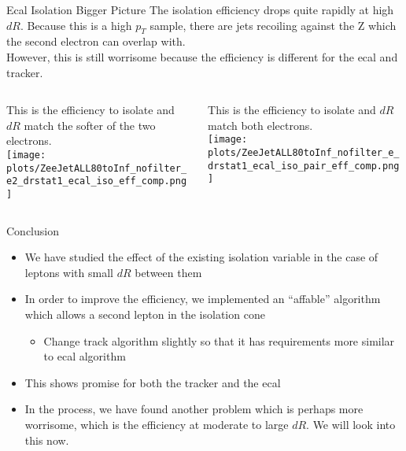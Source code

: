 \documentclass{beamer}
\begin{document}
\begin{frame}{Ecal Isolation Bigger Picture}
  The isolation efficiency drops quite rapidly at high $dR$. Because this is a high $p_T$ sample, there are jets recoiling against the Z which the second electron can overlap with. \\ \medskip However, this is still worrisome because the efficiency is different for the ecal and tracker. \bigskip
  \begin{columns}%

    \begin{column}{0.5\textwidth}
      {\footnotesize{This is the efficiency to isolate and $dR$ match the softer of the two electrons.}} \\ \medskip
      \texttt{[image: plots/ZeeJetALL80toInf\_nofilter\_e2\_drstat1\_ecal\_iso\_eff\_comp.png]}
    \end{column}

    \begin{column}{0.5\textwidth}
      {\footnotesize{This is the efficiency to isolate and $dR$ match both electrons.}} \\ \medskip
      \texttt{[image: plots/ZeeJetALL80toInf\_nofilter\_e\_drstat1\_ecal\_iso\_pair\_eff\_comp.png]}
    \end{column}

  \end{columns}
\end{frame}


\begin{frame}{Conclusion}
  \begin{itemize}
    \item We have studied the effect of the existing isolation variable in the case of leptons with small $dR$ between them
    \item In order to improve the efficiency, we implemented an ``affable'' algorithm which allows a second lepton in the isolation cone
      \begin{itemize}
      \item Change track algorithm slightly so that it has requirements more similar to ecal algorithm
      \end{itemize}
    \item This shows promise for both the tracker and the ecal
    \item In the process, we have found another problem which is perhaps more worrisome, which is the efficiency at moderate to large $dR$. We will look into this now.
  \end{itemize}
\end{frame}
\end{document}
